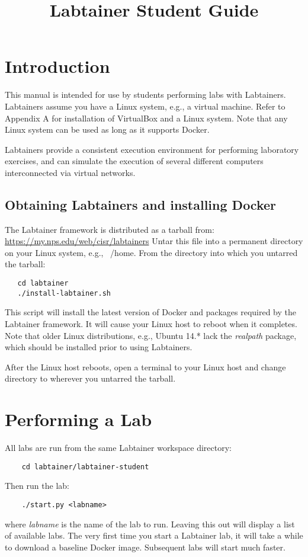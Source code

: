 \documentclass[12pt]{article}
\begin{document}
\title {Labtainer Student Guide}
\maketitle

\section {Introduction}
This manual is intended for use by students performing labs with Labtainers.
Labtainers assume you have a Linux system, e.g., a virtual machine.  Refer to
Appendix A for installation of VirtualBox and a Linux system.
Note that any Linux system can be used as long as it supports Docker.

Labtainers provide a consistent execution environment for performing
laboratory exercises, and can simulate the execution of several different
computers interconnected via virtual networks.   

\subsection{Obtaining Labtainers and installing Docker}
The Labtainer framework is distributed as a tarball from:
\url{https://my.nps.edu/web/cisr/labtainers}
Untar this file into a permanent directory on your Linux system,
e.g., ~/home.  From the directory into which you untarred the
tarball:
\begin{verbatim}
   cd labtainer
   ./install-labtainer.sh
\end{verbatim}

This script will install the latest version of Docker and packages required
by the Labtainer framework.  It will cause your Linux host to reboot when it
completes.
Note that older Linux distributions, e.g., Ubuntu 14.* lack the
\textit{realpath} package, which should be installed prior to using Labtainers.

After the Linux host reboots, open a terminal to your Linux host and
change directory to wherever you untarred the tarball.

\section{Performing a Lab}
All labs are run from the same Labtainer workspace directory:
\begin{verbatim}
    cd labtainer/labtainer-student
\end{verbatim}
\noindent Then run the lab:
\begin{verbatim}
    ./start.py <labname>
\end{verbatim}
\noindent where \textit{labname} is the name of the lab to run.  Leaving this out will 
display a list of available labs.  The very first time you start a Labtainer lab, it will take a while to download
a baseline Docker image.  Subsequent labs will start much faster.
\end{document}
